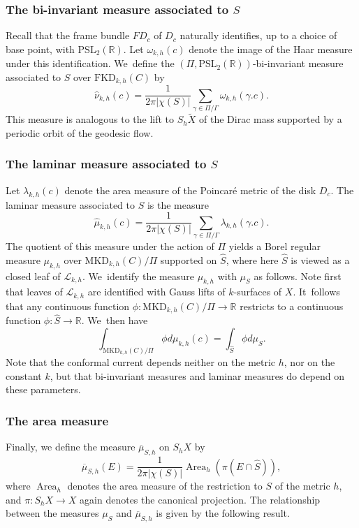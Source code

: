 \documentclass[11pt]{article}
\newcommand{\ksurfaces}{$k$\nobreakdash-surfaces\xspace}
\theoremstyle{plain}
\theoremstyle{definition}
\newcommand\PSL{\mathrm{PSL}_2(\mathbb{R})}
\newcommand{\R}{{\mathbb R}}
\newcommand{\cL}{{\mathcal L}}
\newcommand{\MKD}{\mathrm{MKD}}
\newcommand{\FKD}{\mathrm{FKD}}
\DeclareMathOperator{\Area}{Area}
\begin{document}
\subsubsection*{The bi-invariant measure associated to $S$}
Recall that the frame bundle $FD_c$ of $D_c$ naturally identifies, up to a choice of base point, with $\PSL$. Let $\omega_{k,h}(c)$ denote the image of the Haar measure under this identification. We~define the $(\Pi,\PSL)$-bi-invariant measure associated to $S$ over $\FKD_{k,h}(C)$ by
\begin{equation*}
\hat\nu_{k,h}(c)=\frac{1}{2\pi|\chi(S)|}\sum_{\gamma\in\Pi/\Gamma}\omega_{k,h}(\gamma.c).
\end{equation*}
This measure is analogous to the lift to $S_h \tilde X$ of the Dirac mass supported by a periodic orbit of the geodesic flow.

\subsubsection*{The laminar measure associated to $S$} Let $\lambda_{k,h}(c)$ denote the area measure of the Poincaré metric of the disk $D_c$. The laminar measure associated to $S$ is the measure
\begin{equation*}
\hat\mu_{k,h}(c)=\frac{1}{2\pi|\chi(S)|}\sum_{\gamma\in\Pi/\Gamma}\lambda_{k,h}(\gamma.c).
\end{equation*}
The quotient of this measure under the action of $\Pi$ yields a Borel regular measure $\mu_{k,h}$ over $\MKD_{k,h}(C)/\Pi$ supported on $\hat S$, where here $\hat S$ is viewed as a closed leaf of $\cL_{k,h}$. We~identify the measure $\mu_{k,h}$ with $\mu_S$ as follows. Note first that leaves of $\cL_{k,h}$ are identified with Gauss lifts of \ksurfaces of $X$. It~follows that any continuous function $\phi:\MKD_{k,h}(C)/\Pi\to\R$ restricts to a continuous function $\phi:\hat S\to\R$. We~then have
\begin{equation}\label{eq.ident_measures}
\int_{\MKD_{k,h}(C)/\Pi} \phi d\mu_{k,h}(c)=\int_{\hat S}\phi d\mu_S.
\end{equation}
Note that the conformal current depends neither on the metric $h$, nor on the constant $k$, but that bi-invariant measures and laminar measures do depend on these parameters.

\subsubsection*{The area measure} Finally, we define the measure $\overline{\mu}_{S,h}$ on $S_hX$ by
\begin{equation}\label{eq.area_measure}
\overline{\mu}_{S,h}(E)=\frac{1}{2\pi|\chi(S)|}\Area_h(\pi(E\cap\hat S)),
\end{equation}
where $\Area_h$ denotes the area measure of the restriction to $S$ of the metric $h$, and $\pi:S_hX\to X$ again denotes the canonical projection. The relationship between the measures $\mu_S$ and $\overline\mu_{S,h}$ is given by the following result.
\end{document}
